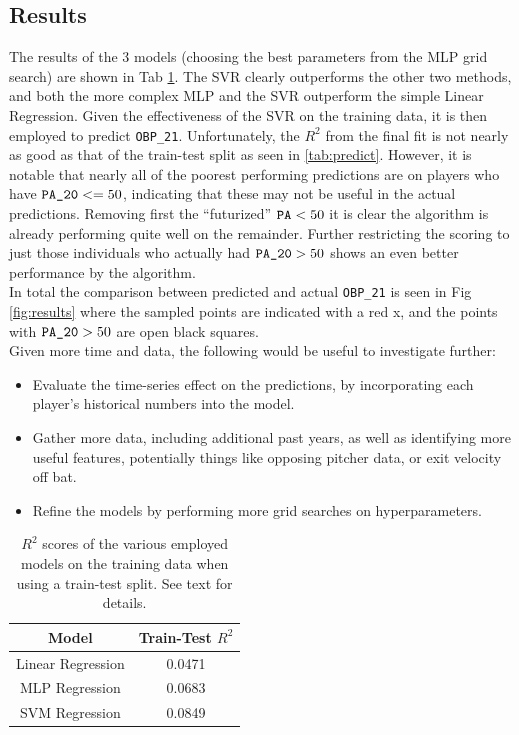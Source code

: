 \documentclass[paper=a4, fontsize=11pt]{scrartcl} %
\begin{document}
\subsection{Results}

The results of the 3 models (choosing the best parameters from the MLP grid search) are shown in Tab \ref{tab:results}. The SVR clearly outperforms the other two methods, and both the more complex MLP and the SVR outperform the simple Linear Regression. Given the effectiveness of the SVR on the training data, it is then employed to predict \verb|OBP_21|. Unfortunately, the $R^2$ from the final fit is not nearly as good as that of the train-test split as seen in \ref{tab:predict}. However, it is notable that nearly all of the poorest performing predictions are on players who have $ \verb|PA_20| <= 50 $, indicating that these may not be useful in the actual predictions. Removing first the ``futurized'' $\verb|PA| < 50 $ it is clear the algorithm is already performing quite well on the remainder. Further restricting the scoring to just those individuals who actually had $\verb|PA_20|>50$ shows an even better performance by the algorithm. 
\\
In total the comparison between predicted and actual \verb|OBP_21| is seen in Fig \ref{fig:results} where the sampled points are indicated with a red x, and the points with $\verb|PA_20|>50$ are open black squares.
\\
Given more time and data, the following would be useful to investigate further: 
\begin{itemize}
\item Evaluate the time-series effect on the predictions, by incorporating each player's historical numbers into the model.
\item Gather more data, including additional past years, as well as identifying more useful features, potentially things like opposing pitcher data, or exit velocity off bat.
\item Refine the models by performing more grid searches on hyperparameters. 
\end{itemize}

\begin{table}
\begin{center}
\begin{tabular}{ |c|c| }
 \hline
 Model & Train-Test $R^2$\\ [0.5ex] 
 \hline
 \hline
 Linear Regression & 0.0471 \\
 MLP Regression & 0.0683\\
 SVM Regression & 0.0849\\
 \hline
\end{tabular} \label{tab:results}
\caption{$R^2$ scores of the various employed models on the training data when using a train-test split. See text for details.}
\end{center}
\end{table}
\end{document}

